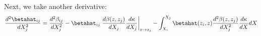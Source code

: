 Next, we take another derivative:
\begin{equation}
\frac{d^2 \betahat_{i j}}{d X_j^2} = \frac{d^2 \beta_{i j}}{d X_j^2} -  \betahat_{i j} \left. \frac{d \beta(z, z_j)}{d X_j} \frac{d \kappa}{d X_j} \right|_{z \rightarrow z_j}  - \int_{X_i}^{X_j} \betahat(z_i, z) \frac{d^2 \beta(z, z_j)}{d X_j^2} \frac{d \kappa}{d X} d X 
\end{equation}
  
  